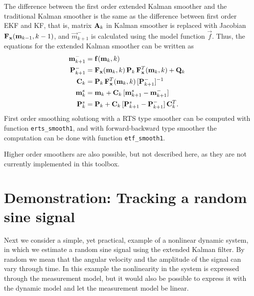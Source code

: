 The difference between the first order extended Kalman smoother \citep{Cox:1964,Sage+Melsa:1971} and the traditional Kalman smoother is the
same as the difference between first order EKF and KF, that is, matrix
$\mathbf{A}_k$ in Kalman smoother is replaced with Jacobian
$\mathbf{F}_{\mathbf{x}}(\mathbf{m}_{k-1},k-1)$, and $\vec{m}_{k+1}^-$ is
calculated using the model function $\vec{f}$.  Thus, the equations
for the extended Kalman smoother can be written as
%
\begin{equation}
\begin{split}
    \mathbf{m}^-_{k+1} &= \mathbf{f}(\mathbf{m}_{k},k) \\
    \mathbf{P}^-_{k+1} &= \mathbf{F}_{\mathbf{x}}(\mathbf{m}_{k},k) \, \mathbf{P}_{k} \,
     \mathbf{F}_{\mathbf{x}}^T(\mathbf{m}_{k},k) + \mathbf{Q}_{k} \\
    \mathbf{C}_{k} &= \mathbf{P}_k \, \mathbf{F}_{\mathbf{x}}^T(\mathbf{m}_{k},k) \,
      [\mathbf{P}^-_{k+1}]^{-1} \\
    \mathbf{m}^s_k &= \mathbf{m}_k
    + \mathbf{C}_k \, [\mathbf{m}^s_{k+1} - \mathbf{m}^-_{k+1}] \\
    \mathbf{P}^s_k &= \mathbf{P}_k
    + \mathbf{C}_k \, [\mathbf{P}^s_{k+1} - \mathbf{P}^-_{k+1}] \, \mathbf{C}^T_k.
    \label{eq:derts}
\end{split}
\end{equation}
%
First order smoothing solutiong with a RTS type smoother can be
computed with function \texttt{erts\_smooth1}, and with
forward-backward type smoother the computation can be done with
function \texttt{etf\_smooth1}.

Higher order smoothers are also possible, but not described here, as
they are not currently implemented in this toolbox.

%
\section{Demonstration: Tracking a random sine signal}
%
Next we consider a simple, yet practical, example of a nonlinear
dynamic system, in which we estimate a random sine signal using the
extended Kalman filter. By random we mean that the angular velocity
and the amplitude of the signal can vary through time. In this example
the nonlinearity in the system is expressed through the measurement
model, but it would also be possible to express it with the dynamic
model and let the measurement model be linear.


